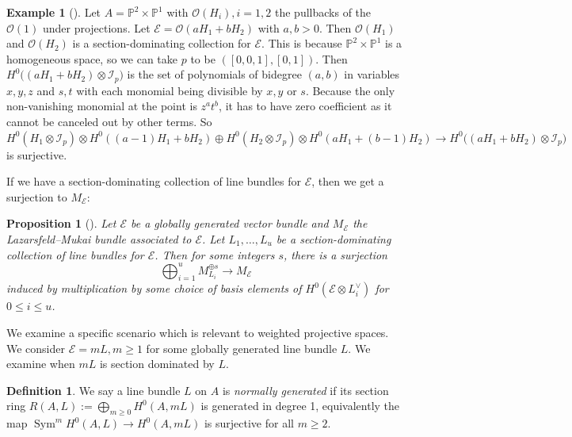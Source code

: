 \documentclass{amsart}
\newtheorem{proposition}[theorem]{Proposition}
\theoremstyle{definition}
\newtheorem{definition}[theorem]{Definition}
\newtheorem{example}[theorem]{Example}
\theoremstyle{remark}
\begin{document}
\begin{example}[{\cite[Example 2.4]{coskun2019algebraichyperbolicitygeneralsurfaces}}]
Let $A = \mathbb{P}^2 \times \mathbb{P}^1$ with $\mathcal O(H_i), i = 1,2$ the pullbacks of the $\mathcal O(1)$ under projections. 
Let $\mathcal{E} =\mathcal O(aH_1 + bH_2)$ with $a,b > 0$. Then $\mathcal O(H_1)$ and $\mathcal O (H_2)$ is a section-dominating collection for $\mathcal{E}$. This is because $ \mathbb{P}^2 \times \mathbb{P}^1$ is a homogeneous space, so we can take $p$ to be $([0,0,1],[0,1])$. 
Then $H^0\!\bigl((aH_1 + bH_2) \otimes \mathcal{I}_p\bigr)$
is the set of polynomials of bidegree $(a,b)$ in variables $x,y,z$ and $s,t$ with each monomial being divisible by $x,y$ or $s$. Because the only non-vanishing monomial at the point is $z^at^b$, it has to have zero coefficient as it cannot be canceled out by other terms. 
So
$
H^0(H_1 \otimes \mathcal{I}_p) \otimes H^0((a-1)H_1 + bH_2) \oplus
H^0(H_2 \otimes \mathcal{I}_p) \otimes H^0(aH_1 + (b-1)H_2)
\to
H^0\!\bigl((aH_1 + bH_2)\otimes \mathcal{I}_p\bigr)
$ is surjective.
\end{example}



If we have a section-dominating collection of line bundles for $\mathcal{E}$, then we get a surjection to $M_{\mathcal{E}}$:

\medskip

\begin{proposition}[{\cite[Proposition~2.6]{coskun2019algebraichyperbolicitygeneralsurfaces}}]
Let $\mathcal{E}$ be a globally generated vector bundle and $M_{\mathcal{E}}$
the Lazarsfeld--Mukai bundle associated to $\mathcal{E}$.
Let $L_1, \dots, L_u$ be a section-dominating collection of line bundles for $\mathcal{E}$.
Then for some integers $s$, there is a surjection
$$
\bigoplus_{i=1}^{u} M_{L_i}^{\oplus s} \longrightarrow M_{\mathcal{E}}
$$
induced by multiplication by some choice of basis elements of
$H^{0}(\mathcal{E} \otimes L_i^{\vee})$ for $0 \leq i \leq u$.
\medskip

\end{proposition}

We examine a specific scenario which is relevant to weighted projective spaces. We consider $\mathcal E = mL, m\geq1$ for some globally generated line bundle $L$. We examine when $mL$ is section dominated by $L$.
\begin{definition}
    We say a line bundle $L$ on $A$ is \emph{normally generated} if its section ring $R(A, L):= \bigoplus_{m \geq 0}  H^0(A,mL)$ is generated in degree 1, equivalently the map $\operatorname{Sym}^m H^0(A,L)\to H^0(A,mL)$ is surjective for all $m\geq 2$.
 \end{definition} 
\end{document}
